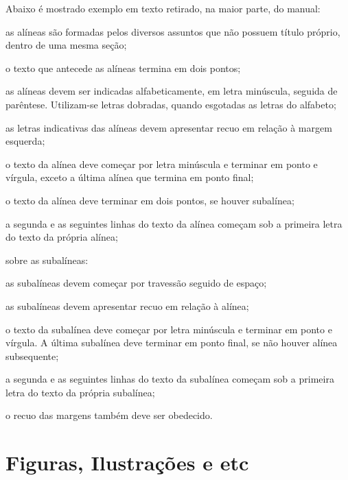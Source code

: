 \vspace{18pt}
Abaixo é mostrado exemplo em texto retirado, na maior parte, do manual:
\begin{alineas}%
	\item as alíneas são formadas pelos diversos assuntos que não possuem título próprio, dentro de uma mesma seção;
	\item o texto que antecede as alíneas termina em dois pontos;
	\item as alíneas devem ser indicadas alfabeticamente, em letra minúscula, seguida de parêntese. Utilizam-se letras dobradas, quando esgotadas as letras do alfabeto;
	\item as letras indicativas das alíneas devem apresentar recuo em relação à margem esquerda;
	\item o texto da alínea deve começar por letra minúscula e terminar em ponto e vírgula, exceto a última alínea que termina em ponto final;
	\item o texto da alínea deve terminar em dois pontos, se houver subalínea;
	\item a segunda e as seguintes linhas do texto da alínea começam sob a primeira letra do texto da própria alínea;
	\item sobre as subalíneas:
	\begin{alineas}
		\item as subalíneas devem começar por travessão seguido de espaço;
		\item as subalíneas devem apresentar recuo em relação à alínea;
		\item o texto da subalínea deve começar por letra minúscula e terminar em ponto e vírgula. A última subalínea deve terminar em ponto final, se não houver alínea subsequente;
		\item a segunda e as seguintes linhas do texto da subalínea começam sob a primeira letra do texto da própria subalínea;
		\item o recuo das margens também deve ser obedecido.
	\end{alineas}
\end{alineas}


\section{Figuras, Ilustrações e etc}

